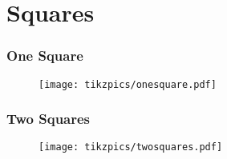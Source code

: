 \documentclass[../main.tex]{subfiles}
\begin{document}
\chapter{Squares}

\subsection{One Square}

\begin{figure}[h!]
    \texttt{[image: tikzpics/onesquare.pdf]}
\end{figure}

\subsection{Two Squares}

\begin{figure}[h!]
    \texttt{[image: tikzpics/twosquares.pdf]}
\end{figure}
\end{document}
